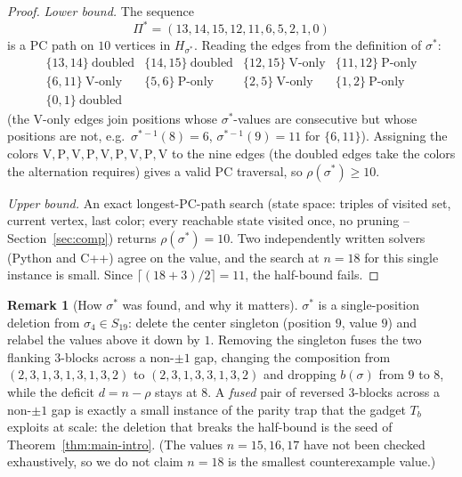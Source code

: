 \documentclass[11pt]{article}
\theoremstyle{definition}
\newtheorem{remark}[theorem]{Remark}
\begin{document}
\begin{proof}
\emph{Lower bound.} The sequence
\[
  \Pi^\ast=(13,14,15,12,11,6,5,2,1,0)
\]
is a PC path on $10$ vertices in $H_{\sigma^\ast}$. Reading the edges from the
definition of $\sigma^\ast$:
\[
\begin{array}{llll}
\{13,14\}\ \text{doubled} & \{14,15\}\ \text{doubled} & \{12,15\}\ \text{V-only} &
\{11,12\}\ \text{P-only} \\
\{6,11\}\ \text{V-only} & \{5,6\}\ \text{P-only} & \{2,5\}\ \text{V-only} &
\{1,2\}\ \text{P-only} \\
\{0,1\}\ \text{doubled}
\end{array}
\]
(the V-only edges join positions whose $\sigma^\ast$-values are consecutive but whose
positions are not, e.g.\ $\sigma^{\ast-1}(8)=6$, $\sigma^{\ast-1}(9)=11$ for
$\{6,11\}$). Assigning the colors
$\mathrm V,\mathrm P,\mathrm V,\mathrm P,\mathrm V,\mathrm P,\mathrm V,\mathrm P,
\mathrm V$ to the nine edges (the doubled edges take the colors the alternation
requires) gives a valid PC traversal, so $\rho(\sigma^\ast)\ge10$.

\emph{Upper bound.} An exact longest-PC-path search
(state space: triples of visited set, current vertex, last color; every reachable state
visited once, no pruning -- Section~\ref{sec:comp}) returns $\rho(\sigma^\ast)=10$. Two
independently written solvers (Python and C++) agree on the value, and the search at
$n=18$ for this single instance is small. Since $\lceil(18+3)/2\rceil=11$, the
half-bound fails.
\end{proof}

\begin{remark}[How $\sigma^\ast$ was found, and why it matters]\label{rem:howfound}
$\sigma^\ast$ is a single-position deletion from $\sigma_4\in S_{19}$: delete the center
singleton (position $9$, value $9$) and relabel the values above it down by $1$.
Removing the singleton fuses the two flanking $3$-blocks across a non-$\pm1$ gap,
changing the composition from $(2,3,1,3,1,3,1,3,2)$ to $(2,3,1,3,3,1,3,2)$ and dropping
$b(\sigma)$ from $9$ to $8$, while the deficit $d=n-\rho$ stays at $8$. A
\emph{fused} pair of reversed $3$-blocks across a non-$\pm1$ gap is exactly a small
instance of the parity trap that the gadget $T_b$ exploits at scale: the deletion that
breaks the half-bound is the seed of Theorem~\ref{thm:main-intro}. (The values
$n=15,16,17$ have not been checked exhaustively, so we do not claim $n=18$ is the
smallest counterexample value.)
\end{remark}
\end{document}

